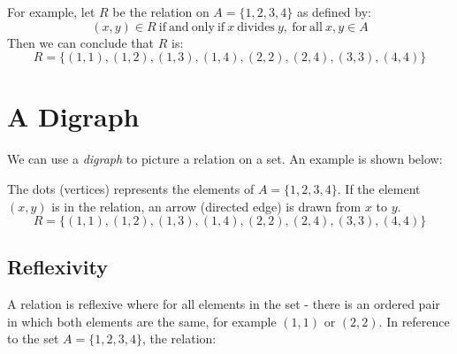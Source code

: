 For example, let $R$ be the relation on $A = \{1, 2, 3, 4\}$ as defined by:
\[(x, y) \in R \mathrm{\ if\ and\ only\ if\ } x \mathrm{\ divides\ } y\mathrm{,\ for\ all\ } x, y \in A \]
Then we can conclude that $R$ is:
\[R = \{(1,1), (1,2), (1,3), (1,4), (2,2), (2,4), (3,3), (4,4)\}\]

\section{A Digraph}
We can use a \textit{digraph} to picture a relation on a set. An example is shown below:
\begin{figure}[H]
    \centering
\end{figure}

The dots (vertices) represents the elements of $A = \{1,2,3,4\}$. If the element $(x, y)$ is in the relation, an arrow (directed edge) is drawn from $x$ to $y$. 
\[R = \{(1,1), (1,2), (1,3), (1,4), (2,2), (2,4), (3,3), (4,4)\}\]

\subsection{Reflexivity}
A relation is reflexive where for all elements in the set - there is an ordered pair in which both elements are the same, for example $(1,1)$ or $(2,2)$. In reference to the set $A = \{1, 2, 3, 4\}$, the relation:


